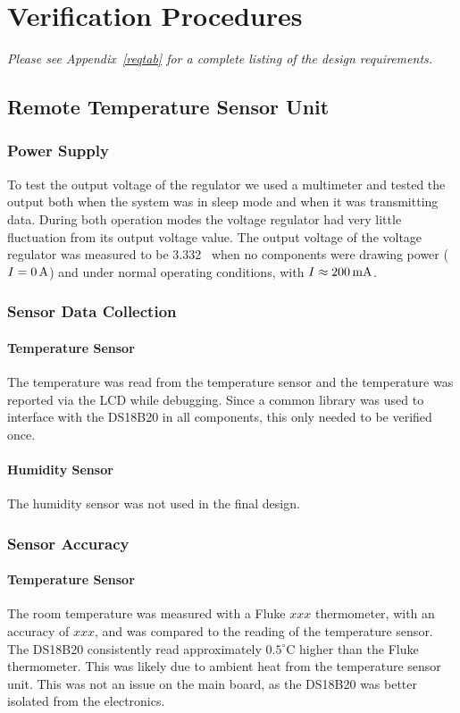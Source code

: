 \section{Verification Procedures}
\emph{Please see Appendix~\ref{reqtab} for a complete listing of the design requirements.}
\subsection{Remote Temperature Sensor Unit}
\subsubsection{Power Supply}
To test the output voltage of the regulator we used a multimeter and tested the output both when the system was in sleep mode and when it was transmitting data. During both operation modes the voltage regulator had very little fluctuation from its output voltage value. The output voltage of the voltage regulator was measured to be 3.332 \volts\ when no components were drawing power ($I=0\mbox{\,A}$) and under normal operating conditions, with $I\approx200\mbox{\,mA}$. 

\subsubsection{Sensor Data Collection}
\paragraph{Temperature Sensor}
The temperature was read from the temperature sensor and the temperature was reported via the LCD while debugging.  Since a common library was used to interface with the DS18B20 in all components, this only needed to be verified once.

\paragraph{Humidity Sensor}
The humidity sensor was not used in the final design.

\subsubsection{Sensor Accuracy}
\paragraph{Temperature Sensor}
The room temperature was measured with a Fluke $xxx$ thermometer, with an accuracy of $xxx$, and was compared to the reading of the temperature sensor.  The DS18B20 consistently read approximately $0.5^\circ$C higher than the Fluke thermometer.  This was likely due to ambient heat from the temperature sensor unit.  This was not an issue on the main board, as the DS18B20 was better isolated from the electronics.

